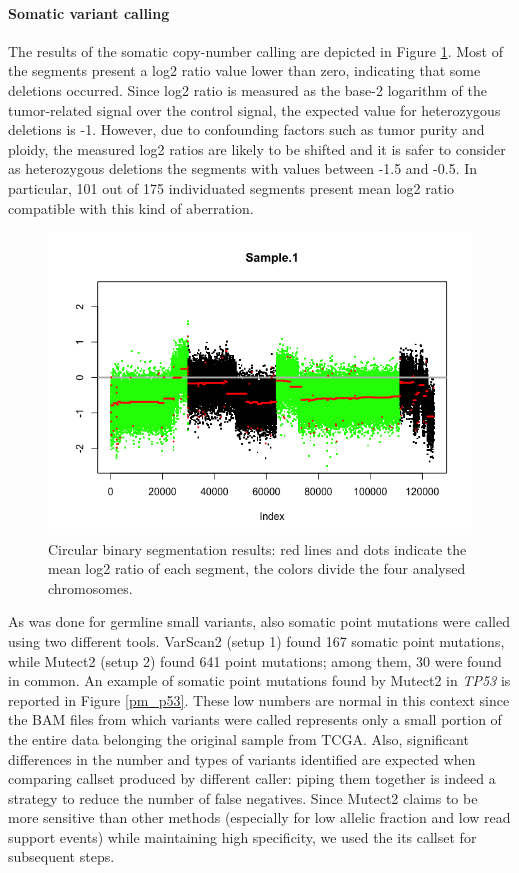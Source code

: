 \documentclass[11pt]{article}
\begin{document}
\paragraph{Somatic variant calling}

The results of the somatic copy-number calling are depicted in Figure \ref{fig:CBS}. Most of the segments present a log2 ratio value lower than zero, indicating that some deletions occurred. Since log2 ratio is measured as the base-2 logarithm of the tumor-related signal over the control signal, the expected value for heterozygous deletions is -1. However, due to confounding factors such as tumor purity and ploidy, the measured log2 ratios are likely to be shifted and it is safer to consider as heterozygous deletions the segments with values between -1.5 and -0.5. In particular, 101 out of 175 individuated segments present mean log2 ratio compatible with this kind of aberration. 

\begin{figure}[H]
\centering
    \centering
    \includegraphics[width=0.8\linewidth]{images/SCNA_calling.png}
    \caption{\label{fig:CBS}\footnotesize{Circular binary segmentation results: red lines and dots indicate the mean log2 ratio of each segment, the colors divide the four analysed chromosomes.}}
\end{figure}

As was done for germline small variants, also somatic point mutations were called using two different tools. VarScan2 (setup 1) found 167 somatic point mutations, while Mutect2 (setup 2) found 641 point mutations; among them, 30 were found in common. An example of somatic point mutations found by Mutect2 in \emph{TP53} is reported in Figure \ref{pm_p53}. These low numbers are normal in this context since the BAM files from which variants were called represents only a small portion of the entire data belonging the original sample from TCGA. Also, significant differences in the number and types of variants identified are expected when comparing callset produced by different caller: piping them together is indeed a strategy to reduce the number of false negatives. Since Mutect2 claims to be more sensitive than other methods (especially for low allelic fraction and low read support events) while maintaining high specificity, we used the its callset for subsequent steps.
\end{document}
